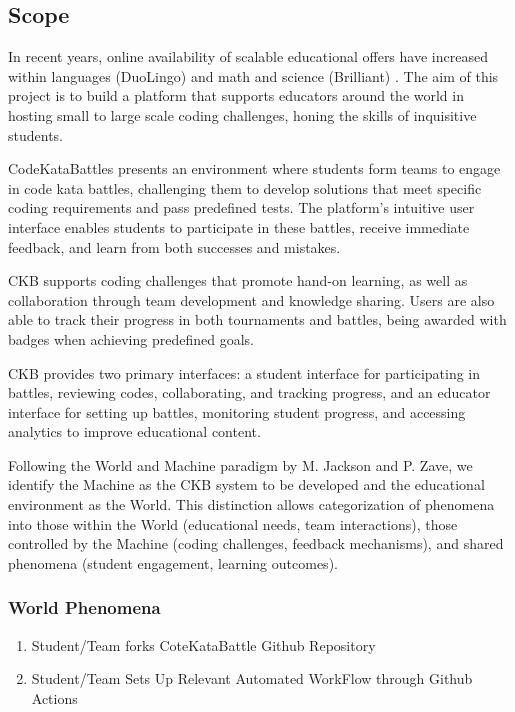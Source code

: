 \subsection{Scope}
In recent years, online availability of scalable educational offers have increased within languages (DuoLingo) and math and science (Brilliant) . The aim of this project is to build a platform that supports educators around the world in hosting small to large scale coding challenges, honing the skills of inquisitive students. 

CodeKataBattles presents an environment where students form teams to engage in code kata battles, challenging them to develop solutions that meet specific coding requirements and pass predefined tests. The platform's intuitive user interface enables students to participate in these battles, receive immediate feedback, and learn from both successes and mistakes.

CKB supports coding challenges that promote hand-on learning, as well as collaboration through team development and knowledge sharing. Users are also able to track their progress in both tournaments and battles, being awarded with badges when achieving predefined goals. 

CKB provides two primary interfaces: a student interface for participating in battles, reviewing codes, collaborating, and tracking progress, and an educator interface for setting up battles, monitoring student progress, and accessing analytics to improve educational content.

Following the World and Machine paradigm by M. Jackson and P. Zave, we identify the Machine as the CKB system to be developed and the educational environment as the World. This distinction allows categorization of phenomena into those within the World (educational needs, team interactions), those controlled by the Machine (coding challenges, feedback mechanisms), and shared phenomena (student engagement, learning outcomes).
\subsubsection{World Phenomena}
\begin{enumerate}
    \item Student/Team forks CoteKataBattle Github Repository
    \item Student/Team Sets Up Relevant Automated WorkFlow through Github Actions 
    
\end{enumerate}


